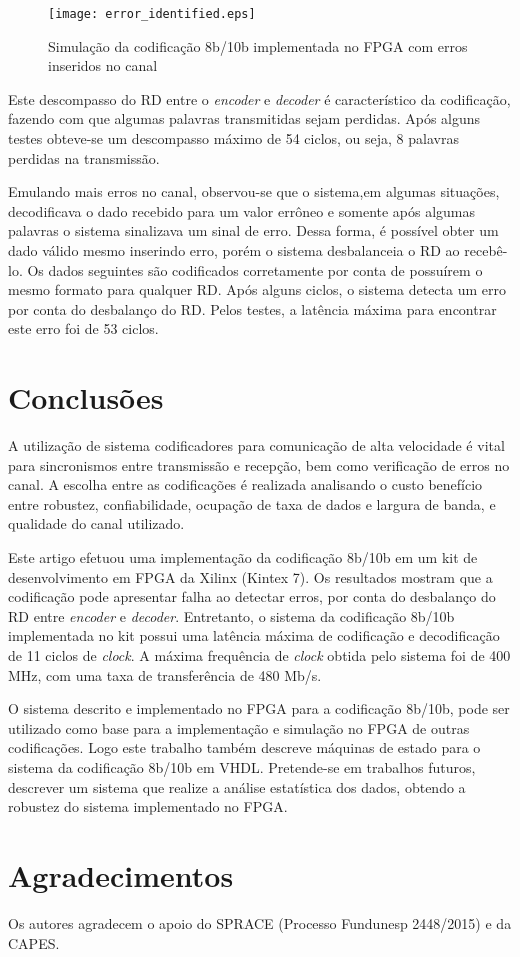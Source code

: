 \documentclass[11pt,twocolumn]{article}
\begin{document}
\begin{figure}[htb]
	\centering
	\texttt{[image: error\_identified.eps]}
	\caption{Simulação da codificação 8b/10b implementada no FPGA com erros inseridos no canal}
	\label{errodetected}
\end{figure}

Este descompasso do RD entre o \textit{encoder} e \textit{decoder} é característico da codificação, fazendo com que algumas palavras transmitidas sejam perdidas. Após alguns testes obteve-se um descompasso máximo de 54 ciclos, ou seja, 8 palavras perdidas na transmissão.

Emulando mais erros no canal, observou-se que o sistema,em algumas situações, decodificava o dado recebido para um valor errôneo e somente após algumas palavras o sistema sinalizava um sinal de erro. Dessa forma, é possível obter um dado válido mesmo inserindo erro, porém o sistema desbalanceia o RD ao recebê-lo. Os dados seguintes são codificados corretamente por conta de possuírem o mesmo formato para qualquer RD. Após alguns ciclos, o sistema detecta um erro por conta do desbalanço do RD. Pelos testes, a latência máxima para encontrar este erro foi de 53 ciclos.

\section{Conclusões}

A utilização de sistema codificadores para comunicação de alta velocidade é vital para sincronismos entre transmissão e recepção, bem como verificação de erros no canal. A escolha entre as codificações é realizada analisando o custo benefício entre robustez, confiabilidade, ocupação de taxa de dados e largura de banda, e qualidade do canal utilizado.

Este artigo efetuou uma implementação da codificação 8b/10b em um kit de desenvolvimento em FPGA da Xilinx (Kintex 7). Os resultados mostram que a codificação pode apresentar falha ao detectar erros, por conta do desbalanço do RD entre \textit{encoder} e \textit{decoder}. Entretanto, o sistema da codificação 8b/10b implementada no kit possui uma latência máxima de codificação e decodificação de 11 ciclos de \textit{clock}. A máxima frequência de \textit{clock} obtida pelo sistema foi de 400 MHz, com uma taxa de transferência de 480 Mb/s.

O sistema descrito e implementado no FPGA para a codificação 8b/10b, pode ser utilizado como base para a implementação e simulação no FPGA de outras codificações.   Logo este trabalho também descreve máquinas de estado para o sistema da codificação 8b/10b em VHDL. Pretende-se em trabalhos futuros, descrever um sistema que realize a análise estatística dos dados, obtendo a robustez do sistema implementado no FPGA.

\section*{Agradecimentos}

Os autores agradecem o apoio do SPRACE (Processo Fundunesp 2448/2015) e da CAPES.



\end{document}
